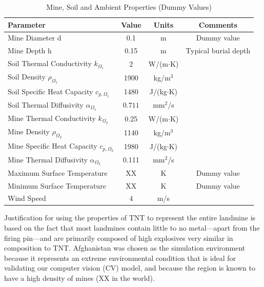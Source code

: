     \begin{table}[ht]
    \centering
    \caption{Mine, Soil and Ambient Properties (Dummy Values)}
    \label{tab:properties}
    \begin{tabular}{lccc}
    \hline
    \textbf{Parameter} & \textbf{Value} & \textbf{Units} & \textbf{Comments}\\
    \hline
    Mine Diameter d       & 0.1     & m    & Dummy value\\
    Mine Depth h          & 0.15   & m    & Typical burial depth\\
    Soil Thermal Conductivity $k_{\Omega_1}$ & 2  & W/(m$\cdot$K) & \cite{dummyRef1}\\
    Soil Density $\rho_{\Omega_1}$     & 1900     & kg/m$^3$ & \cite{dummyRef1}\\
    Soil Specific Heat Capacity $c_{p,{\Omega_1}}$  & 1480     & J/(kg$\cdot$K) & \cite{dummyRef1}\\
    Soil Thermal Diffusivity $\alpha_{\Omega_1}$ & $0.711$ & mm$^2$/s    & \cite{dummyRef2}\\
    Mine Thermal Conductivity $k_{\Omega_2}$ & 0.25  & W/(m$\cdot$K) & \cite{dummyRef1}\\
    Mine Density $\rho_{\Omega_2}$      & 1140     & kg/m$^3$ & \cite{dummyRef1}\\
    Mine Specific Heat Capacity $c_{p,{\Omega_2}}$ & 1980     & J/(kg$\cdot$K) & \cite{dummyRef1}\\
    Mine Thermal Diffusivity $\alpha_{\Omega_2}$ & 0.111 & mm$^2$/s    & \cite{dummyRef2}\\
    Maximum Surface Temperature & XX & K    & Dummy value\\
    Minimum Surface Temperature & XX & K    & Dummy value\\
    Wind Speed          & 4      & m/s  & \cite{dummyRef2}\\
    \hline
    \end{tabular}
    \end{table}

    Justification for using the properties of TNT to represent the entire landmine is based on the fact that most landmines contain little to no metal—apart from the firing pin—and are primarily composed of high explosives very similar in composition to TNT. Afghanistan was chosen as the simulation environment because it represents an extreme environmental condition that is ideal for validating our computer vision (CV) model, and because the region is known to have a high density of mines (XX in the world).

